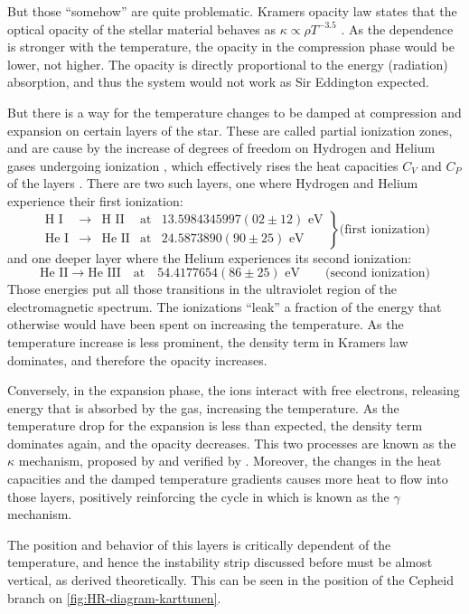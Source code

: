 	But those \enquote{somehow} are quite problematic. Kramers opacity law states that 
	the optical opacity of the stellar material behaves as $\kappa \propto \rho T^{-3.5}$ \citep{Carroll2017}.
	As the dependence is stronger with the temperature, the opacity in the compression phase would be lower, not higher.
	The opacity is directly proportional to the energy (radiation) absorption, and thus the system would not work as Sir Eddington expected.
	
	But there is a way for the temperature changes to be damped at compression and expansion on certain layers of the star. 
	These are called partial ionization zones, and are cause by the increase of degrees of freedom on Hydrogen and Helium gases undergoing ionization \citep{Cox1963},
	which effectively rises the heat capacities $C_V$ and $C_P$ of the layers \citep{Carroll2017}.
	There are two such layers, one where Hydrogen and Helium experience their first ionization:
	$$
		\left.\begin{matrix}
			\text{H I} &\to &\text{H II} & \text{at} & 13.5984345997(02\pm12) \text{ eV} \\
			\text{He I} &\to &\text{He II} & \text{at} &  24.5873890(90\pm25) \text{ eV}
		\end{matrix}\right\} \text{(first ionization)}
	$$
	and one deeper layer where the Helium experiences its second ionization:
	$$
		\text{He II} \to \text{He III}\quad \text{at}\quad 54.4177654(86\pm25) \text{ eV} \qquad \text{(second ionization)}
	$$
	Those energies \citep{NIST_ASD} put all those transitions in the ultraviolet region of the electromagnetic spectrum.
	The ionizations \enquote{leak} a fraction of the energy that otherwise would have been spent on increasing the temperature.
	As the temperature increase is less prominent, the density term in Kramers law dominates, and therefore the opacity increases.
	
	Conversely, in the expansion phase, the ions interact with free electrons, releasing energy that is absorbed by the gas, increasing the temperature.
	As the temperature drop for the expansion is less than expected, the density term dominates again, and the opacity decreases. 
	This two processes are known as the $\kappa$ mechanism, proposed by \cite{Zhevakin1963} and verified by \cite{Cox1963}.
	Moreover, the changes in the heat capacities and the damped temperature gradients causes more heat to flow into those layers,
	positively reinforcing the cycle in which is known as the $\gamma$ mechanism.
	
	The position and behavior of this layers is critically dependent of the temperature, and hence the instability strip discussed before must be almost vertical,
	as \cite{Cox1963} derived theoretically. This can be seen in the position of the Cepheid branch on \autoref{fig:HR-diagram-karttunen}.

